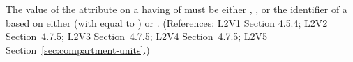 The value of the  attribute on a \Compartment having
 of  must be either ,
, or the identifier of a \UnitDefinition based on
either  (with  equal to ) or
.  (References: L2V1 Section 4.5.4; L2V2
Section~4.7.5; L2V3 Section~4.7.5; L2V4 Section~4.7.5; L2V5 Section~\ref{sec:compartment-units}.)
